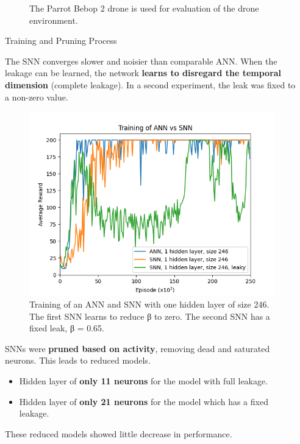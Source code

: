 \documentclass[final,35pt]{beamer}
\newlength{\sepwidth}
\newlength{\colwidth}
\newcommand{\separatorcolumn}{\begin{column}{\sepwidth}\end{column}}
\begin{document}
\begin{frame}
\begin{columns}[t]
\begin{column}{\colwidth}
\begin{figure}[h!]
\begin{minipage}{0.45\textwidth}
        \caption{{\fontsize{28}{40}\selectfont The Parrot Bebop 2 drone is used for evaluation of the drone environment.}}
        \label{fig:image2}
    \end{minipage}
\end{figure}
\vspace{1.5cm}

  \begin{block}{{\fontsize{48}{40}\selectfont Training and Pruning Process}}

The SNN converges slower and noisier than comparable ANN. When the leakage can be learned, the network \textbf{learns to disregard the temporal dimension} (complete leakage). In a second experiment, the leak was fixed to a non-zero value.
\begin{figure}
    \centering
    \includegraphics[width=.5\textwidth]{figures/training_3models.png}
    \caption{{\fontsize{28}{40}\selectfont  Training of an ANN and SNN with one hidden layer
of size 246. The first SNN learns to reduce β to zero. The
second SNN has a fixed leak, β = 0.65.}}
    \label{fig:training}
\end{figure}

{
SNNs were \textbf{pruned based on activity}, removing dead and saturated neurons. This leads to reduced models.
\begin{itemize}
    \item Hidden layer of \textbf{only 11 neurons} for the model with full leakage.
    \item Hidden layer of \textbf{only 21 neurons} for the model which has a fixed leakage.
\end{itemize}
These reduced models showed little decrease in performance.
   }
  \end{block}
\end{column}
\separatorcolumn


\end{columns}
\end{frame}
\end{document}
